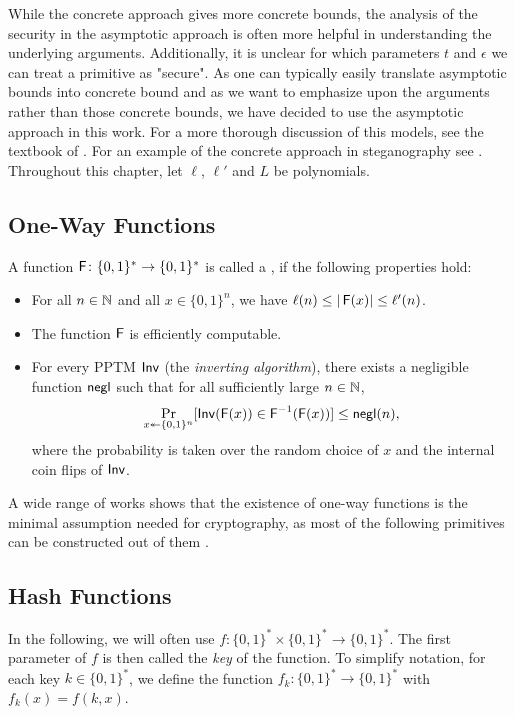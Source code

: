 While the concrete approach gives more concrete bounds, the analysis of
the security in the asymptotic approach is often more helpful in
understanding the underlying arguments. Additionally, it is unclear for
which parameters $t$ and $\epsilon$ we can treat a primitive as
"secure". As one can typically easily translate asymptotic bounds into
concrete bound and as we want to emphasize upon the arguments rather
than those concrete bounds, we have decided to use the asymptotic
approach in this work. For a more thorough discussion of this models,
see the textbook of \citeauthor{lindell2007introduction}
\cite[pp. 49-52]{lindell2007introduction}.  For an example of the
concrete approach in steganography see \eg
\cite{berndt2016pattern}. Throughout this chapter, let $\ell$, $\ell'$
and $L$ be polynomials.

\subsection*{One-Way Functions}
A function $\operatorname{\mathsf{F}}\colon \{0,1\}^{*}\to \{0,1\}^{*}$ is called a
, if the following properties hold:
\begin{itemize}
\item For all $n\in
  \mathbb{N}$ and all $x\in \{0,1\}^{n}$, we have $\ell(n)\leq |\operatorname{\mathsf{F}}(x)|\leq
  \ell'(n)$. 
\item The function $\operatorname{\mathsf{F}}$ is efficiently computable.
\item For every \ac{PPTM} $\operatorname{\mathsf{Inv}}$ (the \emph{inverting algorithm}), there
  exists a negligible function $\operatorname{\mathsf{negl}}$ such that for all sufficiently
  large $n\in \mathbb{N}$,
  \begin{align*}
    \Pr_{x\twoheadleftarrow \{0,1\}^{n}}[\operatorname{\mathsf{Inv}}(\operatorname{\mathsf{F}}(x))\in \operatorname{\mathsf{F}}^{-1}(\operatorname{\mathsf{F}}(x))]\leq \operatorname{\mathsf{negl}}(n),
  \end{align*}
where the probability is taken over the random choice of $x$ and the
internal coin flips of $\operatorname{\mathsf{Inv}}$.
\end{itemize}

A wide range of works shows that the existence of one-way functions is
the minimal assumption needed for cryptography, as most of the following
primitives can be constructed out of them
\cite[pp. 181-225]{lindell2007introduction}. 

\subsection*{Hash Functions}
In the following, we will often use  $f\colon
\{0,1\}^{*}\times \{0,1\}^{*}\to \{0,1\}^{*}$. The first parameter of
$f$ is then called the \emph{key} of the function. To simplify notation,
for each key $k\in \{0,1\}^{*}$, we define the function $f_{k}\colon
\{0,1\}^{*}\to \{0,1\}^{*}$ with $f_{k}(x)=f(k,x)$.

